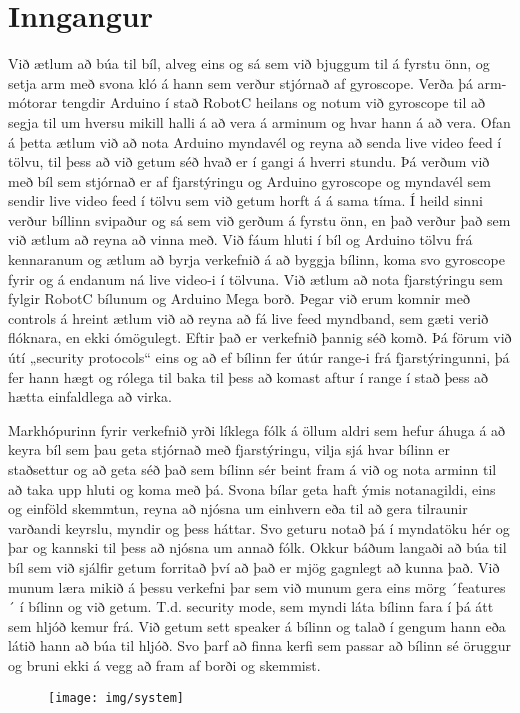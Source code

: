 \section{Inngangur}
Við ætlum að búa til bíl, alveg eins og sá sem við bjuggum til á fyrstu önn, og setja arm með svona kló á hann sem verður stjórnað af gyroscope. Verða þá arm-mótorar tengdir Arduino í stað RobotC heilans og notum við gyroscope til að segja til um hversu mikill halli á að vera á arminum og hvar hann á að vera. Ofan á þetta ætlum við að nota Arduino myndavél og reyna að senda live video feed í tölvu, til þess að við getum séð hvað er í gangi á hverri stundu.
Þá verðum við með bíl sem stjórnað er af fjarstýringu og Arduino gyroscope og myndavél sem sendir live video feed í tölvu sem við getum horft á á sama tíma.
Í heild sinni verður bíllinn svipaður og sá sem við gerðum á fyrstu önn, en það verður það sem við ætlum að reyna að vinna með.
Við fáum hluti í bíl og Arduino tölvu frá kennaranum og ætlum að byrja verkefnið á að byggja bílinn, koma svo gyroscope fyrir og á endanum ná live video-i í tölvuna. Við ætlum að nota fjarstýringu sem fylgir RobotC bílunum og Arduino Mega borð.
Þegar við erum komnir með controls á hreint ætlum við að reyna að fá live feed myndband, sem gæti verið flóknara, en ekki ómögulegt. Eftir það er verkefnið þannig séð komð. Þá förum við útí „security protocols“ eins og að ef bílinn fer útúr range-i frá fjarstýringunni, þá fer hann hægt og rólega til baka til þess að komast aftur í range í stað þess að hætta einfaldlega að virka.

Markhópurinn fyrir verkefnið yrði líklega fólk á öllum aldri sem hefur áhuga á að keyra bíl sem þau geta stjórnað með fjarstýringu, vilja sjá hvar bílinn er staðsettur og að geta séð það sem bílinn sér beint fram á við og nota arminn til að taka upp hluti og koma með þá.
Svona bílar geta haft ýmis notanagildi, eins og einföld skemmtun, reyna að njósna um einhvern eða til að gera tilraunir varðandi keyrslu, myndir og þess háttar. Svo geturu notað þá í myndatöku hér og þar og kannski til þess að njósna um annað fólk.
Okkur báðum langaði að búa til bíl sem við sjálfir getum forritað því að það er mjög gagnlegt að kunna það. Við munum læra mikið á þessu verkefni þar sem við munum gera eins mörg ´features´ í bílinn og við getum. T.d. security mode, sem myndi láta bílinn fara í þá átt sem hljóð kemur frá. Við getum sett speaker á bílinn og talað í gengum hann eða látið hann að búa til hljóð. Svo þarf að finna kerfi sem passar að bílinn sé öruggur og bruni ekki á vegg að fram af borði og skemmist.


\begin{figure}[h]
\texttt{[image: img/system]}
\end{figure}
